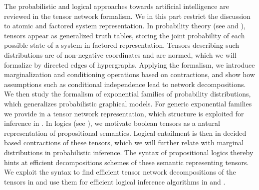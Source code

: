 The probabilistic and logical approaches towards artificial intelligence are reviewed in the tensor network formalism.
We in this part restrict the discussion to atomic and factored system representation.
In probability theory (see  and ), tensors appear as generalized truth tables, storing the joint probability of each possible state of a system in factored representation.
Tensors describing such distributions are of non-negative coordinates and are normed, which we will formalize by directed edges of hypergraphs.
Applying the formalism, we introduce marginalization and conditioning operations based on contractions, and show how assumptions such as conditional independence lead to network decompositions.
We then study the formalism of exponential families of probability distributions, which generalizes probabilistic graphical models.
For generic exponential families we provide in  a tensor network representation, which structure is exploited for inference in .
In logics (see ), we motivate boolean tensors as a natural representation of propositional semantics.
Logical entailment is then in  decided based contractions of these tensors, which we will further relate with marginal distributions in probabilistic inference.
The syntax of propositional logics thereby hints at efficient decompositions schemes of these semantic representing tensors.
We exploit the syntax to find efficient tensor network decompositions of the tensors in  and use them for efficient logical inference algorithms in and .
